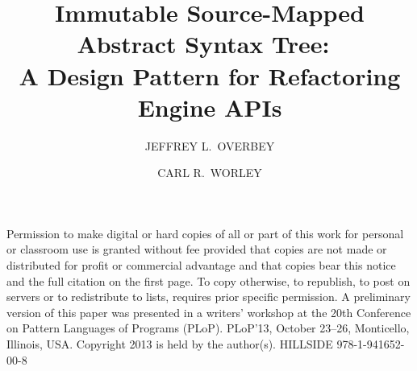 \documentclass[prodmode]{acmlarge}
\title{Immutable Source-Mapped Abstract Syntax Tree:\ \\
A Design Pattern for Refactoring Engine APIs} %
\author{JEFFREY L.\ OVERBEY \and CARL R.\ WORLEY \affil{Auburn University}}
\begin{document}
\begin{bottomstuff}
Permission to make digital or hard copies of all or part of this work for
personal or classroom use is granted without fee provided that copies are not
made or distributed for profit or commercial advantage and that copies bear
this notice and the full citation on the first page. To copy otherwise, to
republish, to post on servers or to redistribute to lists, requires prior
specific permission. A preliminary version of this paper was presented in a
writers' workshop at the 20th Conference on Pattern Languages of Programs
(PLoP).  PLoP'13, October 23--26, Monticello, Illinois, USA. Copyright 2013 is
held by the author(s). HILLSIDE 978-1-941652-00-8
\end{bottomstuff}


\maketitle
\end{document}
